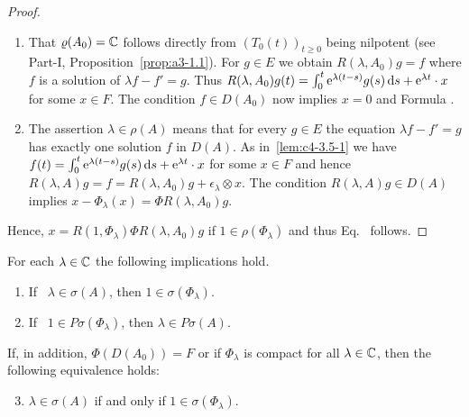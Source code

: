 \begin{proof}
\begin{enumerate}[\upshape (i), wide, labelindent=.25em] 
    \item 
    That $\rho(A_{0}) = \C$ follows directly from $(T_{0}(t))_{t \geq 0}$ being nilpotent (see Part-I, Proposition~\ref{prop:a3-1.1}). For $g \in E$ we obtain $R(\lambda,A_{0})g = f$ where $f$ is a solution of\/ $\lambda f - f' = g$.
    Thus $R(\lambda,A_{0})g(t) = \int_{0}^{t} \mathrm{e}^{\lambda(t-s)}g(s)\mathop{}\!\mathrm{d}{s} + \mathrm{e}^{\lambda t} \cdot x$ for some $x \in F$. The condition $f \in D(A_{0})$ now implies $x = 0$ and Formula .
    
    \item 
    The assertion $\lambda \in \rho(A)$ means that for every $g \in E$ the equation $\lambda f - f' = g$ has exactly one solution $f$ in $D(A)$. As in~\ref{lem:c4-3.5-1} we have 
    $f(t) = \int_{0}^{t} \mathrm{e}^{\lambda(t-s)}g(s)\mathop{}\!\mathrm{d}{s} + \mathrm{e}^{\lambda t} \cdot x$ for some $x \in F$ and hence
    $R(\lambda,A)g = f = R(\lambda,A_{0})g + \epsilon_{\lambda}  \otimes x$. 
    The condition $R(\lambda,A)g \in D(A)$ implies $x - \Phi_{\lambda}(x) = \Phi R(\lambda,A_{0})g$. 
\end{enumerate}    
    Hence, $x = R(1,\Phi_{\lambda})\Phi R(\lambda,A_{0})g$ if\/ $1 \in \rho(\Phi_{\lambda})$ and thus Eq.~ follows.
\end{proof}
\begin{proposition}\label{prop:c4-3.6}
For each $\lambda \in \mathbb{C}$ the following implications hold.
\begin{enumerate}[\upshape (i)]
\item \label{prop:c4-3.6-1}
If \, $\lambda \in \sigma(A)$, then $1 \in \sigma(\Phi_{\lambda})$.
\item \label{prop:c4-3.6-2}
If \, $1 \in P\sigma(\Phi_{\lambda})$, then $\lambda \in P\sigma(A)$.
\end{enumerate}
If, in addition, $\Phi(D(A_{0})) = F$ or if\/ $\Phi_{\lambda}$ is compact for all $\lambda \in \mathbb{C}$, then the following equivalence holds:
\begin{enumerate}[\upshape (i)]
\setcounter{enumi}{2}
\item \label{prop:c4-3.6-3}
$\lambda \in \sigma(A)$ if and only if\/ $1 \in \sigma(\Phi_{\lambda})$.
\end{enumerate}
\end{proposition}
